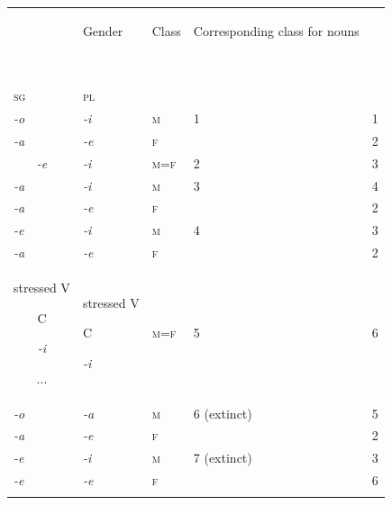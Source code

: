 \documentclass[output=paper]{langscibook}
\begin{document}
\begin{tabularx}{\textwidth}{XXXXX}

\lsptoprule

\multicolumn{2}{c}{Adjectives’ endings} & Gender

~ & Class

~ & Corresponding class for nouns

~\\
\textsc{sg} & \textsc{pl} &  &  & \\
\textit{{}-o} & \textit{{}-i} & \textsc{m} & 1 & 1\\
\textit{{}-a} & \textit{{}-e} & \textsc{f} &  & 2\\
\multicolumn{1}{c}{\textit{{}-e}} & \textit{{}-i} & \textsc{m=f} & 2 & \multicolumn{1}{c}{3}\\
\textit{{}-a} & \textit{{}-i} & \textsc{m} & 3 & 4\\
\textit{{}-a} & \textit{{}-e} & \textsc{f} &  & 2\\
\textit{{}-e} & \textit{{}-i} & \textsc{m} & 4 & 3\\
\textit{{}-a} & \textit{{}-e} & \textsc{f} &  & 2\\
\multicolumn{1}{c}{stressed V

C

\textit{{}-i}

...} & stressed V

C

\textit{{}-i} & \textsc{m=f} & 5 & \multicolumn{1}{c}{6}\\
\textit{{}-o} & \textit{{}-a} & \textsc{m} & 6 (extinct) & 5\\
\textit{{}-a} & \textit{{}-e} & \textsc{f} &  & 2\\
\textit{{}-e} & \textit{{}-i} & \textsc{m} & 7 (extinct) & 3\\
\textit{{}-e} & \textit{{}-e} & \textsc{f} &  & 6\\
\lspbottomrule
\end{tabularx}
\end{document}
